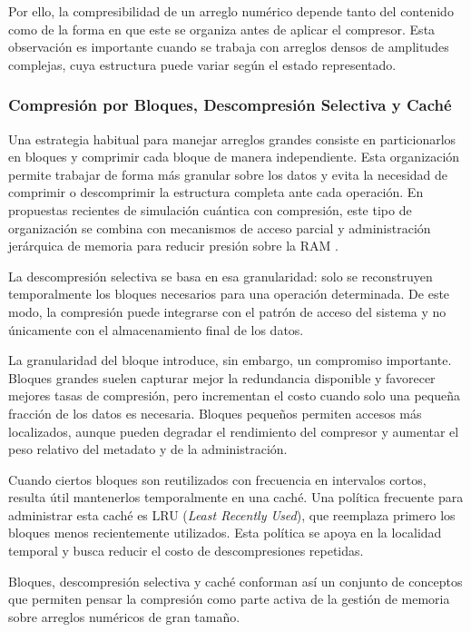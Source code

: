 Por ello, la compresibilidad de un arreglo numérico depende tanto del contenido como de la forma en que este se organiza antes de aplicar el compresor. Esta observación es importante cuando se trabaja con arreglos densos de amplitudes complejas, cuya estructura puede variar según el estado representado.

\subsubsection{Compresión por Bloques, Descompresión Selectiva y Caché}

Una estrategia habitual para manejar arreglos grandes consiste en particionarlos en bloques y comprimir cada bloque de manera independiente. Esta organización permite trabajar de forma más granular sobre los datos y evita la necesidad de comprimir o descomprimir la estructura completa ante cada operación. En propuestas recientes de simulación cuántica con compresión, este tipo de organización se combina con mecanismos de acceso parcial y administración jerárquica de memoria para reducir presión sobre la RAM \parencite{wu2019full,Zhang2025BMQSim}.

La descompresión selectiva se basa en esa granularidad: solo se reconstruyen temporalmente los bloques necesarios para una operación determinada. De este modo, la compresión puede integrarse con el patrón de acceso del sistema y no únicamente con el almacenamiento final de los datos.

La granularidad del bloque introduce, sin embargo, un compromiso importante. Bloques grandes suelen capturar mejor la redundancia disponible y favorecer mejores tasas de compresión, pero incrementan el costo cuando solo una pequeña fracción de los datos es necesaria. Bloques pequeños permiten accesos más localizados, aunque pueden degradar el rendimiento del compresor y aumentar el peso relativo del metadato y de la administración.

Cuando ciertos bloques son reutilizados con frecuencia en intervalos cortos, resulta útil mantenerlos temporalmente en una caché. Una política frecuente para administrar esta caché es LRU (\emph{Least Recently Used}), que reemplaza primero los bloques menos recientemente utilizados. Esta política se apoya en la localidad temporal y busca reducir el costo de descompresiones repetidas.

Bloques, descompresión selectiva y caché conforman así un conjunto de conceptos que permiten pensar la compresión como parte activa de la gestión de memoria sobre arreglos numéricos de gran tamaño.

